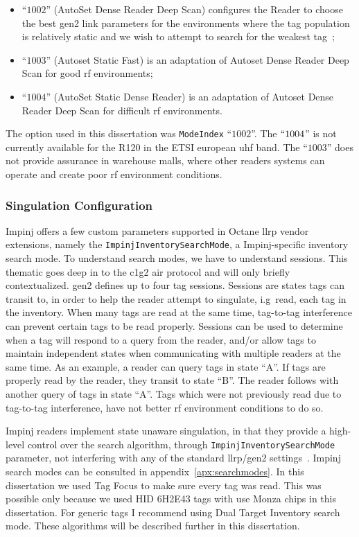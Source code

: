 \begin{itemize}
    \item ``$1002$'' (AutoSet Dense Reader Deep Scan) configures the Reader to choose the best \ac{gen2} link parameters for the environments where the tag population is relatively static and we wish to attempt to search for the weakest tag~\cite{ReaderMode1002};
    \item ``$1003$'' (Autoset Static Fast) is an adaptation of Autoset Dense Reader Deep Scan for good \ac{rf} environments;
    \item ``$1004$'' (AutoSet Static Dense Reader) is an adaptation of Autoset Dense Reader Deep Scan for difficult \ac{rf} environments.
\end{itemize}

The option used in this dissertation was \texttt{ModeIndex} ``$1002$''. The $``1004$'' is not currently available for the R120 in the ETSI european \ac{uhf} band. The ``$1003$'' does not provide assurance in warehouse malls, where other readers systems can operate and create poor \ac{rf} environment conditions.

\subsubsection{Singulation Configuration}

Impinj offers a few custom parameters supported in Octane \ac{llrp} vendor extensions, namely the \texttt{ImpinjInventorySearchMode}, a Impinj-specific inventory search mode. 
To understand search modes, we have to understand sessions. This thematic goes deep in to the \ac{c1g2} air protocol and will only briefly contextualized. \ac{gen2} defines up to four tag sessions. Sessions are states tags can transit to, in order to help the reader attempt to singulate, i.g\ read, each tag in the inventory.
When many tags are read at the same time, tag-to-tag interference can prevent certain tags to be read properly.
Sessions can be used to determine when a tag will respond to a query from the reader, and/or allow tags to maintain independent states when communicating with multiple readers at the same time.
As an example, a reader can query tags in state ``A''. If tags are properly read by the reader, they transit to state ``B''. The reader follows with another query of tags in state ``A''. Tags which were not previously read due to tag-to-tag interference, have not better \ac{rf} environment conditions to do so.

Impinj readers implement state unaware singulation, in that they provide a high-level control over the search algorithm, through \texttt{ImpinjInventorySearchMode} parameter, not interfering with any of the standard \ac{llrp}/\ac{gen2} settings~\cite{ImpinjOctaneLLRP, UnderstandingEPCGen2}.
Impinj search modes can be consulted in appendix~\ref{apx:searchmodes}.
In this dissertation we used Tag Focus to make sure every tag was read. This was possible only because we used HID 6H2E43 tags with use Monza chips in this dissertation. For generic tags I recommend using Dual Target Inventory search mode. These algorithms will be described further in this dissertation.


